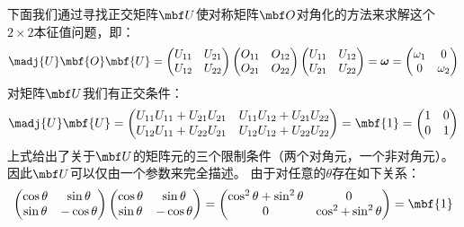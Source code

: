 下面我们通过寻找正交矩阵$\mbf U$使对称矩阵$\mbf O$对角化的方法来求解这个$2\times2$本征值问题，即：
\begin{equation}
 \madj{U}\mbf{O}\mbf{U} = \begin{pmatrix}
     U_{11} & U_{21} \\ U_{12} & U_{22}
 \end{pmatrix} \begin{pmatrix}
     O_{11} & O_{12} \\ O_{21} & O_{22}
 \end{pmatrix} \begin{pmatrix}
     U_{11} & U_{12} \\ U_{21} & U_{22}
 \end{pmatrix} = \boldsymbol\omega = \begin{pmatrix}
     \omega_1 & 0 \\
     0 &\omega_2
 \end{pmatrix}
 \label{eq:1.101}
\end{equation}
对矩阵$\mbf U$我们有正交条件：
\begin{equation}
 \madj{U}\mbf{U} = \begin{pmatrix}
     U_{11}U_{11} + U_{21}U_{21} & U_{11}U_{12} + U_{21}U_{22} \\
     U_{12}U_{11} + U_{22}U_{21} & U_{12}U_{12} + U_{22}U_{22}
 \end{pmatrix} = \mbf{1} = \begin{pmatrix}
     1 & 0 \\ 0 &1
 \end{pmatrix}
 \label{eq:1.102}
\end{equation}
上式给出了关于$\mbf U$的矩阵元的三个限制条件（两个对角元，一个非对角元）。
因此$\mbf U$可以仅由一个参数来完全描述。
由于对任意的$\theta$存在如下关系：
\begin{equation}
 \begin{pmatrix}
     \cos{\theta} &\sin{\theta} \\ \sin{\theta} & -\cos{\theta}
 \end{pmatrix} \begin{pmatrix}
     \cos{\theta} & \sin{\theta} \\ \sin{\theta} &-\cos{\theta}
 \end{pmatrix} = \begin{pmatrix}
     \cos^2{\theta} + \sin^2{\theta} & 0 \\ 0 & \cos^2 + \sin^2{\theta}
 \end{pmatrix} = \mbf{1}
 \label{eq:1.103}
\end{equation}
